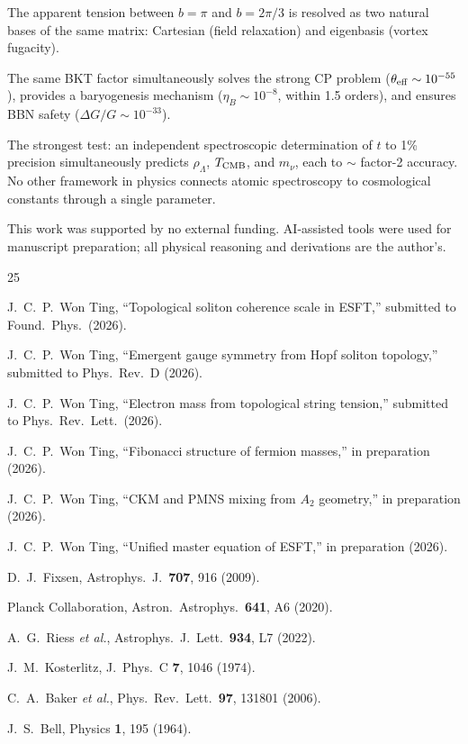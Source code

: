 \documentclass[twocolumn,preprintnumbers,amsmath,amssymb,prd]{revtex4-2}
\begin{document}
The apparent tension between $b = \pi$ and $b = 2\pi/3$ is resolved as two natural bases of the same matrix: Cartesian (field relaxation) and eigenbasis (vortex fugacity).

The same BKT factor simultaneously solves the strong CP problem ($\theta_{\rm eff} \sim 10^{-55}$), provides a baryogenesis mechanism ($\eta_B \sim 10^{-8}$, within 1.5 orders), and ensures BBN safety ($\Delta G/G \sim 10^{-33}$).

The strongest test: an independent spectroscopic determination of $t$ to 1\% precision simultaneously predicts $\rho_\Lambda$, $T_{\rm CMB}$, and $m_\nu$, each to $\sim$ factor-2 accuracy.
No other framework in physics connects atomic spectroscopy to cosmological constants through a single parameter.

\begin{acknowledgments}
This work was supported by no external funding.
AI-assisted tools were used for manuscript preparation; all physical reasoning and derivations are the author's.
\end{acknowledgments}

\begin{thebibliography}{25}

 J.~C.~P.~Won Ting, ``Topological soliton coherence scale in ESFT,'' submitted to Found.\ Phys.\ (2026).

 J.~C.~P.~Won Ting, ``Emergent gauge symmetry from Hopf soliton topology,'' submitted to Phys.\ Rev.\ D (2026).

 J.~C.~P.~Won Ting, ``Electron mass from topological string tension,'' submitted to Phys.\ Rev.\ Lett.\ (2026).

 J.~C.~P.~Won Ting, ``Fibonacci structure of fermion masses,'' in preparation (2026).

 J.~C.~P.~Won Ting, ``CKM and PMNS mixing from $A_2$ geometry,'' in preparation (2026).

 J.~C.~P.~Won Ting, ``Unified master equation of ESFT,'' in preparation (2026).

 D.~J.~Fixsen, Astrophys.\ J.\ \textbf{707}, 916 (2009).

 Planck Collaboration, Astron.\ Astrophys.\ \textbf{641}, A6 (2020).

 A.~G.~Riess \textit{et al.}, Astrophys.\ J.\ Lett.\ \textbf{934}, L7 (2022).

 J.~M.~Kosterlitz, J.\ Phys.\ C \textbf{7}, 1046 (1974).

 C.~A.~Baker \textit{et al.}, Phys.\ Rev.\ Lett.\ \textbf{97}, 131801 (2006).

 J.~S.~Bell, Physics \textbf{1}, 195 (1964).

\end{thebibliography}
\end{document}
